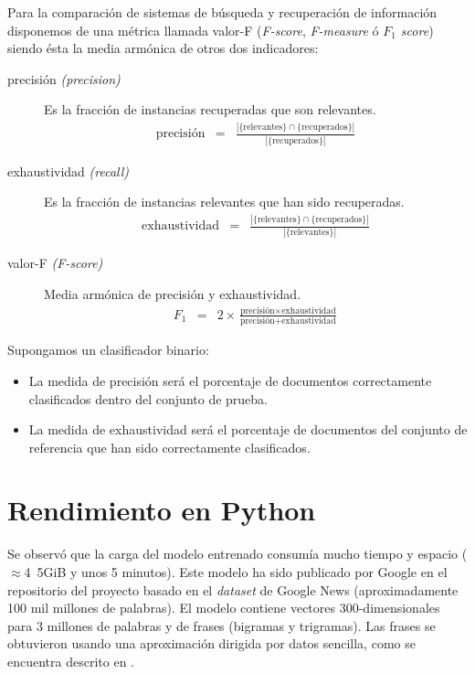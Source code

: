 Para la comparación de sistemas de búsqueda y recuperación de información disponemos de una métrica llamada valor-F (\emph{F-score}, \emph{F-measure} ó \emph{$F_1$ score}) siendo ésta la media armónica de otros dos indicadores: \citep{wikipedia:precision-exhaustividad}
\begin{description}
\item[precisión \emph{(precision)}] 
Es la fracción de instancias recuperadas que son relevantes.
\begin{eqnarray}
\text{precisión} &=& \frac{|\{\text{relevantes}\}\cap\{\text{recuperados}\}|}{|\{\text{recuperados}\}|}
\end{eqnarray}
\item[exhaustividad \emph{(recall)}] 
Es la fracción de instancias relevantes que han sido recuperadas.
\begin{eqnarray}
\text{exhaustividad} &=& \frac{|\{\text{relevantes}\}\cap\{\text{recuperados}\}|}{|\{\text{relevantes}\}|}
\end{eqnarray}
\item[valor-F \emph{(F-score)}] Media armónica de precisión y exhaustividad.
\begin{eqnarray}
F_1 &=& 2\times\frac{\text{precisión}\times\text{exhaustividad}}{\text{precisión}+\text{exhaustividad}}
\end{eqnarray}
\end{description}

Supongamos un clasificador binario:
\begin{itemize}
\item La medida de precisión será el porcentaje de documentos correctamente clasificados dentro del conjunto de prueba.
\item La medida de exhaustividad será el porcentaje de documentos del conjunto de referencia que han sido correctamente clasificados. \citep{Perkins2010}
\end{itemize}


\section{Rendimiento en Python}

Se observó que la carga del modelo entrenado  consumía mucho tiempo y espacio ($\approx$\si{4.5}{GiB} y unos 5 minutos). Este modelo ha sido publicado por Google en el repositorio del proyecto  basado en el \emph{dataset} de Google News (aproximadamente 100 mil millones de palabras). El modelo contiene vectores 300-dimensionales para 3 millones de palabras y de frases (bigramas y trigramas). Las frases se obtuvieron usando una aproximación dirigida por datos sencilla, como se encuentra descrito en \cite{DBLP:journals/corr/MikolovSCCD13}.

